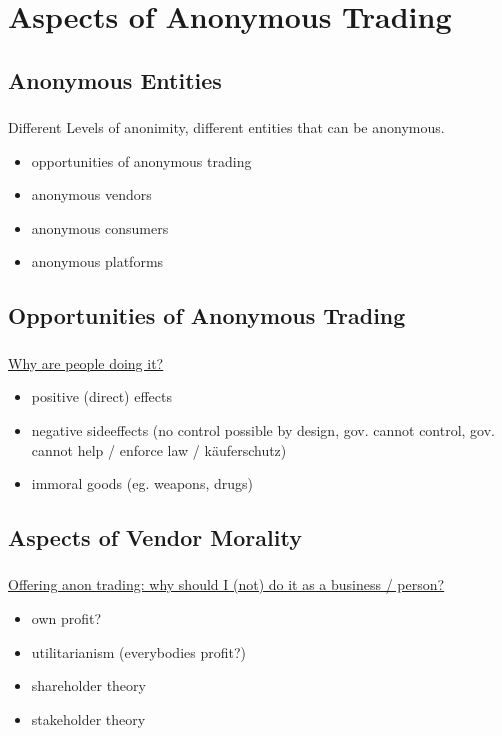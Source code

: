 \section{Aspects of Anonymous Trading}

\subsection{Anonymous Entities}
\begin{frame}
    \frametitle{\insertsubsection}
    Different Levels of anonimity, different entities that can be anonymous.
    \vspace{1em}
    \begin{itemize}
        \itemsep\setlength{.8em}
        \item opportunities of anonymous trading
        \item anonymous vendors
        \item anonymous consumers
        \item anonymous platforms
    \end{itemize}
\end{frame}

\subsection{Opportunities of Anonymous Trading}
\begin{frame}
    \frametitle{\insertsubsection}
    \underline{Why are people doing it?}
    \vspace{2em}
    \begin{itemize}
        \itemsep\setlength{1em}
        \item positive (direct) effects
        \item negative sideeffects (no control possible by design, gov. cannot control, gov. cannot help / enforce law / käuferschutz)
        \item immoral goods (eg. weapons, drugs)
    \end{itemize}
\end{frame}

\subsection{Aspects of Vendor Morality}
\begin{frame}
    \frametitle{\insertsubsection}
    \underline{Offering anon trading: why should I (not) do it as a business / person?}
    \vspace{1em}
    \begin{itemize}
        \itemsep\setlength{1em}
        \item own profit?
        \item utilitarianism (everybodies profit?)
        \item shareholder theory
        \item stakeholder theory
    \end{itemize}
\end{frame}

